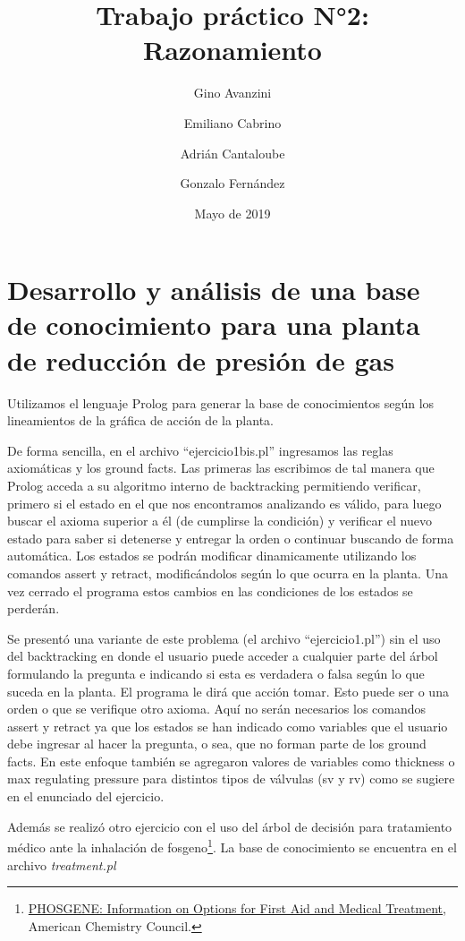 \documentclass[onecolumn]{article}
\title{Trabajo práctico N°2: Razonamiento}
\author{Gino Avanzini \and Emiliano Cabrino \and Adrián Cantaloube \and Gonzalo Fernández}
\date{Mayo de 2019}
\begin{document}
\maketitle

\hypertarget{desarrollo-y-anuxe1lisis-de-una-base-de-conocimiento-para-una-planta-de-reducciuxf3n-de-presiuxf3n-de-gas}{%
\section{Desarrollo y análisis de una base de conocimiento para una
planta de reducción de presión de
gas}\label{desarrollo-y-anuxe1lisis-de-una-base-de-conocimiento-para-una-planta-de-reducciuxf3n-de-presiuxf3n-de-gas}}

Utilizamos el lenguaje Prolog para generar la base de conocimientos
según los lineamientos de la gráfica de acción de la planta.

De forma sencilla, en el archivo ``ejercicio1bis.pl'' ingresamos las
reglas axiomáticas y los ground facts. Las primeras las escribimos de
tal manera que Prolog acceda a su algoritmo interno de backtracking
permitiendo verificar, primero si el estado en el que nos encontramos
analizando es válido, para luego buscar el axioma superior a él (de
cumplirse la condición) y verificar el nuevo estado para saber si
detenerse y entregar la orden o continuar buscando de forma automática.
Los estados se podrán modificar dinamicamente utilizando los comandos
assert y retract, modificándolos según lo que ocurra en la planta. Una
vez cerrado el programa estos cambios en las condiciones de los estados
se perderán.

Se presentó una variante de este problema (el archivo ``ejercicio1.pl'')
sin el uso del backtracking en donde el usuario puede acceder a
cualquier parte del árbol formulando la pregunta e indicando si esta es
verdadera o falsa según lo que suceda en la planta. El programa le dirá
que acción tomar. Esto puede ser o una orden o que se verifique otro
axioma. Aquí no serán necesarios los comandos assert y retract ya que
los estados se han indicado como variables que el usuario debe ingresar
al hacer la pregunta, o sea, que no forman parte de los ground facts. En
este enfoque también se agregaron valores de variables como thickness o
max regulating pressure para distintos tipos de válvulas (sv y rv) como
se sugiere en el enunciado del ejercicio.

Además se realizó otro ejercicio con el uso del árbol de decisión para
tratamiento médico ante la inhalación de fosgeno\footnote{\href{https://www.americanchemistry.com/Phosgene/Medical-Treatment-Decision-Tree-for-Medical-Professionals.html}{PHOSGENE:
  Information on Options for First Aid and Medical Treatment}, American
  Chemistry Council.}. La base de conocimiento se encuentra en el
archivo \emph{treatment.pl}
\end{document}
